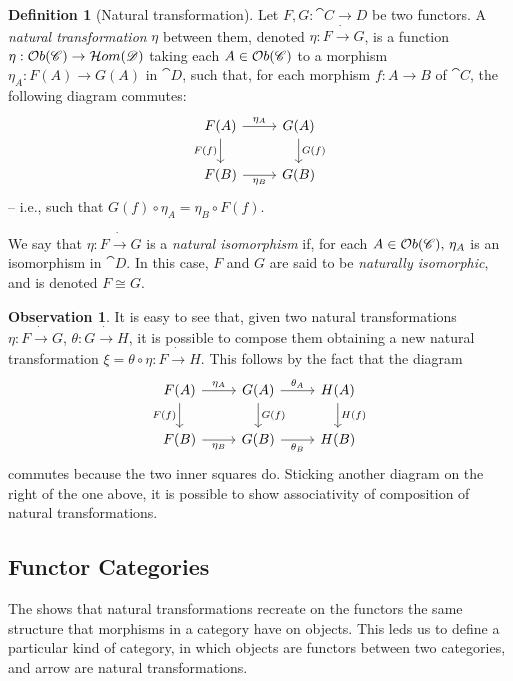 \documentclass[a4paper, twoside,openright]{report}
\theoremstyle{plain}
\theoremstyle{definition}
\newtheorem{definition}[theorem]{Definition}
\newtheorem{obs}[theorem]{Observation}
\begin{document}
\begin{definition}[Natural transformation]
    Let $F,G : \cat {C \rightarrow D}$ be two functors. A \emph{natural transformation} $\eta$ between them, denoted $\eta: F \dot\rightarrow G$, is a function $\eta: \mathcal{O}b(\mathscr{C}) \rightarrow \mathcal{H}om(\mathscr{D})$ taking each $A \in \mathcal{O}b(\mathscr{C})$ to a morphism $\eta_A:F(A) \rightarrow G(A)$ in $\cat{D}$, such that, for each morphism $f: A \rightarrow B$ of $\cat C$, the following diagram commutes:
    \[
        \begin{tikzcd}
            F(A) \arrow[d, "F(f)" swap] \arrow[r, "{\eta_A}"] & G(A) \arrow[d, "G(f)"] \\
            F(B) \arrow[r, "{\eta_B}"swap] & G(B)
        \end{tikzcd}
    \]
    -- i.e., such that $G(f) \circ \eta_A = \eta_B \circ F(f)$.

    We say that $\eta: F \dot\rightarrow G$ is a \emph{natural isomorphism} if, for each $A \in \mathcal{O}b(\mathscr{C}) \text{, } \eta_A$ is an isomorphism in $\cat D$. In this case, $F$ and $G$ are said to be \emph{naturally isomorphic}, and is denoted $F \cong G$.    
\end{definition}

\begin{obs}\label{obs:comp_assoc_nat_tran}
It is easy to see that, given two natural transformations $\eta:F\dot\rightarrow G$, $\theta: G \dot\rightarrow H$, it is possible to compose them obtaining a new natural transformation $\xi = \theta \circ \eta : F \dot \rightarrow H$. This follows by the fact that the diagram
\[
        \begin{tikzcd}
            F(A) \arrow[d, "F(f)" swap] \arrow[r, "{\eta_A}"] 
                & G(A) \arrow[d, "G(f)"] \arrow[r, "{\theta_A}"]
                & H(A) \arrow[d, "H(f)"] \\
            F(B) \arrow[r, "{\eta_B}"swap]
                & G(B) \arrow[r, "{\theta_B}" swap]
                & H(B)
        \end{tikzcd}
\]
commutes because the two inner squares do. Sticking another diagram on the right of the one above, it is possible to show associativity of composition of natural transformations.
\end{obs}

\subsection{Functor Categories}

The  shows that natural transformations recreate on the functors the same structure that morphisms in a category have on objects. This leds us to define a particular kind of category, in which objects are functors between two categories, and arrow are natural transformations.
\end{document}
